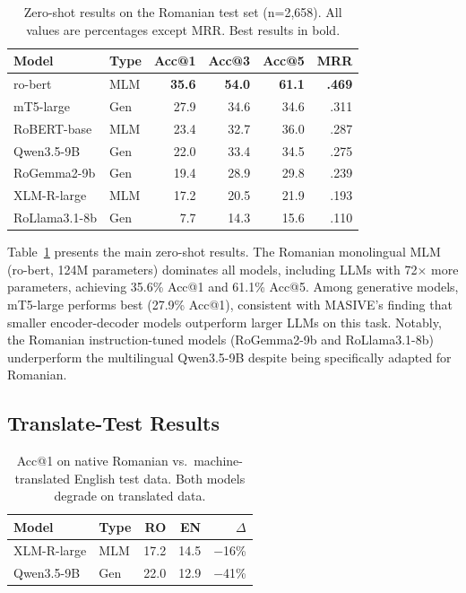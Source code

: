 \documentclass[11pt]{article}
\begin{document}
\begin{table}[t]
    \centering
    \small
    \begin{tabular}{llrrrr}
        \toprule
        Model & Type & Acc@1 & Acc@3 & Acc@5 & MRR \\
        \midrule
        ro-bert & MLM & \textbf{35.6} & \textbf{54.0} & \textbf{61.1} & \textbf{.469} \\
        mT5-large & Gen & 27.9 & 34.6 & 34.6 & .311 \\
        RoBERT-base & MLM & 23.4 & 32.7 & 36.0 & .287 \\
        Qwen3.5-9B & Gen & 22.0 & 33.4 & 34.5 & .275 \\
        RoGemma2-9b & Gen & 19.4 & 28.9 & 29.8 & .239 \\
        XLM-R-large & MLM & 17.2 & 20.5 & 21.9 & .193 \\
        RoLlama3.1-8b & Gen & 7.7 & 14.3 & 15.6 & .110 \\
        \bottomrule
    \end{tabular}
    \caption{Zero-shot results on the Romanian test set (n=2,658). All values are percentages except MRR. Best results in bold.}
    \label{tab:main-results}
\end{table}

Table~\ref{tab:main-results} presents the main zero-shot results. The Romanian monolingual MLM (ro-bert, 124M parameters) dominates all models, including LLMs with 72$\times$ more parameters, achieving 35.6\% Acc@1 and 61.1\% Acc@5. Among generative models, mT5-large performs best (27.9\% Acc@1), consistent with MASIVE's finding that smaller encoder-decoder models outperform larger LLMs on this task. Notably, the Romanian instruction-tuned models (RoGemma2-9b and RoLlama3.1-8b) underperform the multilingual Qwen3.5-9B despite being specifically adapted for Romanian.

\subsection{Translate-Test Results}

\begin{table}[t]
    \centering
    \small
    \begin{tabular}{llrrr}
        \toprule
        Model & Type & RO & EN & $\Delta$ \\
        \midrule
        XLM-R-large & MLM & 17.2 & 14.5 & $-$16\% \\
        Qwen3.5-9B & Gen & 22.0 & 12.9 & $-$41\% \\
        \bottomrule
    \end{tabular}
    \caption{Acc@1 on native Romanian vs.\ machine-translated English test data. Both models degrade on translated data.}
    \label{tab:translate-test}
\end{table}
\end{document}
